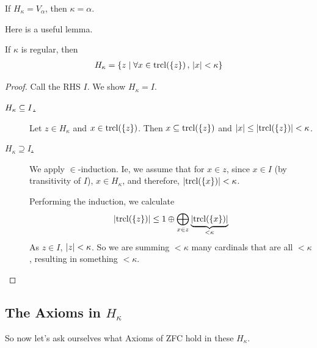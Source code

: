\begin{boxlemma}
    If $H_{\kappa} = V_{\alpha}$, then $\kappa = \alpha$. 
\end{boxlemma}

Here is a useful lemma.

\begin{boxlemma}
    If $\kappa$ is regular, then
    \begin{align*}
        H_{\kappa} = \left\{ z \; \middle\vert \; \forall x \in \operatorname{trcl}\!\left( \left\{ z \right\} \right), \, \left\lvert x \right\rvert < \kappa \right\}
    \end{align*}
\end{boxlemma}
\begin{proof}
    Call the RHS $I$. We show $H_{\kappa} = I$.

    \begin{description}
        \item[\underline{$H_{\kappa} \subseteq I$.}] Let $z \in H_{\kappa}$ and $x \in \operatorname{trcl}\!\left( \left\{ z \right\} \right)$. Then $x \subseteq \operatorname{trcl}\!\left( \left\{ z \right\} \right)$ and $\left\lvert x \right\rvert \le \left\lvert \operatorname{trcl}\!\left( \left\{ z \right\} \right) \right\rvert < \kappa$.

        \item[\underline{$H_{\kappa} \supseteq I$.}] We apply $\in$-induction. Ie, we assume that for $x \in z$, since $x \in I$ (by transitivity of $I$), $x \in H_{\kappa}$, and therefore, $\left\lvert \operatorname{trcl}\!\left( \left\{ x \right\} \right) \right\rvert < \kappa$.

        Performing the induction, we calculate
        \begin{align*}
            \left\lvert \operatorname{trcl}\!\left( \left\{ z \right\} \right) \right\rvert \le 1 \oplus \bigoplus_{x \in z} \underbrace{\left\lvert \operatorname{trcl}\!\left( \left\{ x \right\} \right) \right\rvert}_{< \kappa}
        \end{align*}
        As $z \in I$, $\left\lvert z \right\rvert < \kappa$. So we are summing $< \kappa$ many cardinals that are all $< \kappa$, resulting in something $< \kappa$.
    \end{description}
\end{proof}

\subsection{The Axioms in $H_{\kappa}$}

So now let's ask ourselves what Axioms of ZFC hold in these $H_{\kappa}$.

